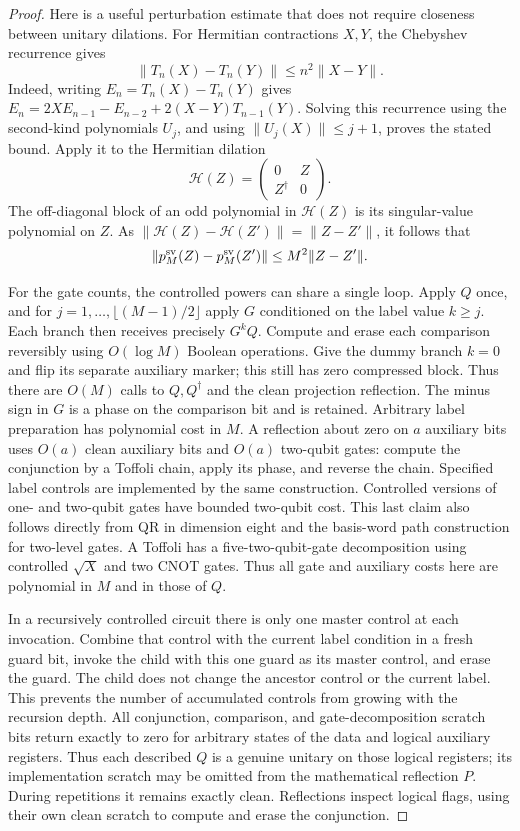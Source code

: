 \documentclass[11pt]{article}
\begin{document}
\begin{proof}
Here is a useful perturbation estimate that does not require closeness
between unitary dilations. For Hermitian contractions $X,Y$, the
Chebyshev recurrence gives
\[
 \|T_n(X)-T_n(Y)\|\leq n^2\|X-Y\|.
\]
Indeed, writing $E_n=T_n(X)-T_n(Y)$ gives
$E_n=2XE_{n-1}-E_{n-2}+2(X-Y)T_{n-1}(Y)$.
Solving this recurrence using the second-kind polynomials $U_j$,
and using $\|U_j(X)\|\leq j+1$, proves the stated bound.
Apply it to the Hermitian dilation
\[
 \mathcal H(Z)=\begin{pmatrix}0&Z\\Z^\dagger&0\end{pmatrix}.
\]
The off-diagonal block of an odd polynomial in $\mathcal H(Z)$ is
its singular-value polynomial on $Z$. As
$\|\mathcal H(Z)-\mathcal H(Z')\|=\|Z-Z'\|$, it follows that
\[
 \|p_M^{\rm sv}(Z)-p_M^{\rm sv}(Z')\|
 \leq M^2\|Z-Z'\|.
\]

For the gate counts, the controlled powers can share a single loop.
Apply $Q$ once, and for $j=1,\ldots,\lfloor(M-1)/2\rfloor$ apply
$G$ conditioned on the label value $k\geq j$. Each branch then
receives precisely $G^kQ$. Compute and erase each comparison
reversibly using $O(\log M)$ Boolean operations. Give the dummy
branch $k=0$ and flip its separate auxiliary marker; this still has
zero compressed block. Thus there are $O(M)$ calls to
$Q,Q^\dagger$ and the clean projection reflection. The minus sign
in $G$ is a phase on the comparison bit and is retained.
Arbitrary label preparation has polynomial cost in $M$.
A reflection about zero on $a$ auxiliary bits uses
$O(a)$ clean auxiliary bits and $O(a)$ two-qubit gates: compute the
conjunction by a Toffoli chain, apply its phase, and reverse the chain.
Specified label controls are implemented by the same construction.
Controlled versions of one- and two-qubit gates have bounded two-qubit
cost. This last claim also follows directly from QR in dimension eight
and the basis-word path construction for two-level gates. A Toffoli
has a five-two-qubit-gate decomposition using controlled $\sqrt X$
and two CNOT gates. Thus all gate and auxiliary costs here are
polynomial in $M$ and in those of $Q$.

In a recursively controlled circuit there is only one master control
at each invocation. Combine that control with the current label
condition in a fresh guard bit, invoke the child with this one guard
as its master control, and erase the guard. The child does not change
the ancestor control or the current label. This prevents the number
of accumulated controls from growing with the recursion depth.
All conjunction, comparison, and gate-decomposition scratch bits
return exactly to zero for arbitrary states of the data and logical
auxiliary registers. Thus each described $Q$ is a genuine unitary
on those logical registers; its implementation scratch may be
omitted from the mathematical reflection $P$. During repetitions
it remains exactly clean. Reflections inspect logical flags, using
their own clean scratch to compute and erase the conjunction.


\end{proof}
\end{document}
